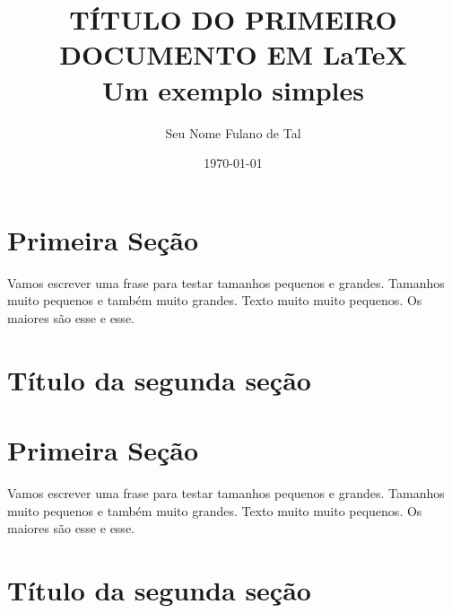 \documentclass[12pt,a4paper, twocolumn]{article}
\title{TÍTULO DO PRIMEIRO DOCUMENTO EM \LaTeX \\
Um exemplo simples}
\author{Seu Nome Fulano de Tal}
\date{\today}
\begin{document}
\maketitle
\newpage
\tableofcontents
\newpage

\section{Primeira Seção}
\doublespacing Vamos escrever uma frase para testar tamanhos {\small pequenos} e {\large grandes}. Tamanhos {\footnotesize muito pequenos} e também {\Large muito grandes}. Texto {\tiny muito muito pequenos}. Os maiores são {\huge esse} e {\Huge esse}.

\singlespacing
\lipsum[1-10]

\section{Título da segunda seção}
\lipsum[1-10]


\section{Primeira Seção}
Vamos escrever uma frase para testar tamanhos {\small pequenos} e {\large grandes}. Tamanhos {\footnotesize muito pequenos} e também {\Large muito grandes}. Texto {\tiny muito muito pequenos}. Os maiores são {\huge esse} e {\Huge esse}.

\lipsum[1-10]

\section{Título da segunda seção}
\lipsum[1-10]
\end{document}
